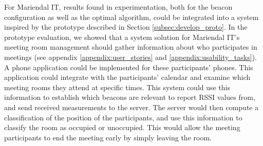 For Mariendal IT, results found in experimentation, both for the beacon configuration as well as the optimal algorithm, could be integrated into a system inspired by the prototype described in Section \ref{subsec:develop_proto}. 
In the prototype evaluation, we showed that a system solution for Mariendal IT's meeting room management should gather information about who participates in meetings (see appendix \ref{appendix:user_stories} and \ref{appendix:usability_tasks}).
A phone application could be implemented for these participants' phones. 
This application could integrate with the participants' calendar and examine which meeting rooms they attend at specific times.
This system could use this information to establish which beacons are relevant to report RSSI values from, and send received measurements to the server. 
The server would then compute a classification of the position of the participants, and use this information to classify the room as occupied or unoccupied. 
This would allow the meeting participants to end the meeting early by simply leaving the room.

